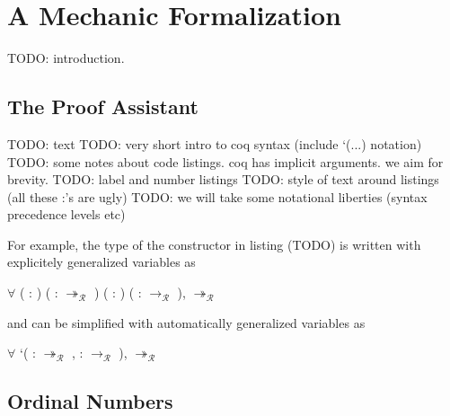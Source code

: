 \chapter{A Mechanic Formalization}\label{chap:implementation}

TODO: introduction.


\section{The \Coq Proof Assistant}

TODO: text
TODO: very short intro to coq syntax (include `(...) notation)
TODO: some notes about code listings. coq has implicit arguments. we aim for
brevity.
TODO: label and number listings
TODO: style of text around listings (all these :'s are ugly)
TODO: we will take some notational liberties (syntax precedence levels etc)

For example, the type of the  constructor in listing
(TODO) is written with explicitely generalized variables as
\begin{singlespace}
\begin{coqdoccode}
\coqdocnoindent
\ensuremath{\forall} (  :
) (\coqdocvar{$\rho$}
:  $\twoheadrightarrow_\mathcal{R}$ )
( : )
(\coqdocvar{$\pi$} : 
$\rightarrow_\mathcal{R}$ ),
 $\twoheadrightarrow_\mathcal{R}$
\coqdoceol
\end{coqdoccode}
\end{singlespace}
and can be simplified with automatically generalized variables as
\begin{singlespace}
\begin{coqdoccode}
\coqdocnoindent
\ensuremath{\forall} `(\coqdocvar{$\rho$} : 
$\twoheadrightarrow_\mathcal{R}$ ,
\coqdocvar{$\pi$} :  $\rightarrow_\mathcal{R}$ ),
 $\twoheadrightarrow_\mathcal{R}$
\coqdoceol
\end{coqdoccode}
\end{singlespace}


\section{Ordinal Numbers}

